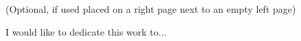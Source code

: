 \begin{dedication}
(Optional, if used placed on a right page next to an empty left page)

I would like to dedicate this work to...
\newpage

\end{dedication}
